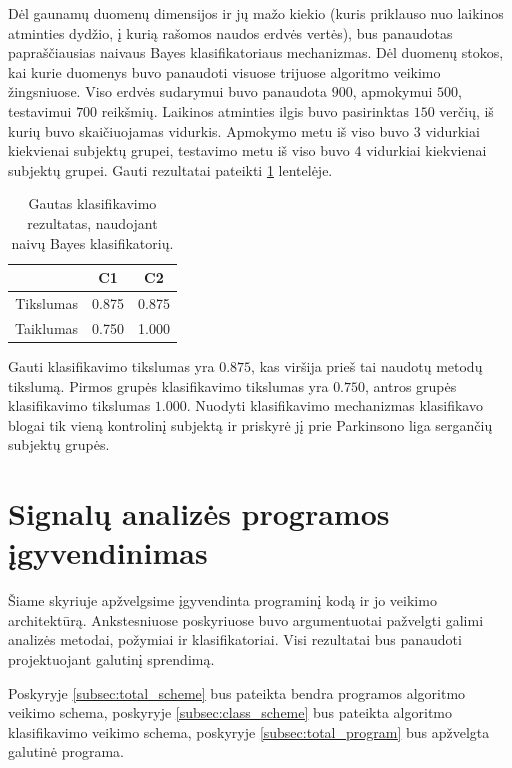 \documentclass[]{vgtuef}
\begin{document}
Dėl gaunamų duomenų dimensijos ir jų mažo kiekio (kuris priklauso nuo laikinos atminties dydžio, į kurią rašomos naudos erdvės vertės), bus panaudotas papraščiausias naivaus Bayes klasifikatoriaus mechanizmas. Dėl duomenų stokos, kai kurie duomenys buvo panaudoti visuose trijuose algoritmo veikimo žingsniuose. Viso erdvės sudarymui buvo panaudota $900$, apmokymui $500$, testavimui $700$ reikšmių. Laikinos atminties ilgis buvo pasirinktas $150$ verčių, iš kurių buvo skaičiuojamas vidurkis. Apmokymo metu iš viso buvo $3$ vidurkiai kiekvienai subjektų grupei, testavimo metu iš viso buvo $4$ vidurkiai kiekvienai subjektų grupei. Gauti rezultatai pateikti \ref{table:classification_results} lentelėje.

\begin{table}
	\centering
	\caption{Gautas klasifikavimo rezultatas, naudojant naivų Bayes klasifikatorių.}
	\label{table:classification_results}
	\begin{tabular}{|c|c|c|} \hline
		& C1 & C2 \\ \hline
    Tikslumas & 0.875 & 0.875 \\ \hline
    Taiklumas & 0.750 & 1.000 \\ \hline
	\end{tabular}
\end{table}

Gauti klasifikavimo tikslumas yra $0.875$, kas viršija prieš tai naudotų metodų tikslumą. Pirmos grupės klasifikavimo tikslumas yra $0.750$, antros grupės klasifikavimo tikslumas $1.000$. Nuodyti klasifikavimo mechanizmas klasifikavo blogai tik vieną kontrolinį subjektą ir priskyrė jį prie Parkinsono liga sergančių subjektų grupės. %

\section{Signalų analizės programos įgyvendinimas}

Šiame skyriuje apžvelgsime įgyvendinta programinį kodą ir jo veikimo architektūrą. Ankstesniuose poskyriuose buvo argumentuotai pažvelgti galimi analizės metodai, požymiai ir klasifikatoriai. Visi rezultatai bus panaudoti projektuojant galutinį sprendimą.

Poskyryje \ref{subsec:total_scheme} bus pateikta bendra programos algoritmo veikimo schema, poskyryje \ref{subsec:class_scheme} bus pateikta algoritmo klasifikavimo veikimo schema, poskyryje \ref{subsec:total_program} bus apžvelgta galutinė programa.
\end{document}
